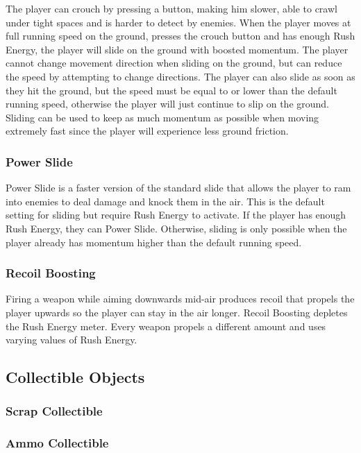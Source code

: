 \documentclass[12pt]{article}
\begin{document}
The player can crouch by pressing a button, making him slower, able to crawl under tight spaces and is harder to detect by enemies. When the player moves at full running speed on the ground, presses the crouch button and has enough Rush Energy, the player will slide on the ground with boosted momentum. The player cannot change movement direction when sliding on the ground, but can reduce the speed by attempting to change directions. The player can also slide as soon as they hit the ground, but the speed must be equal to or lower than the default running speed, otherwise the player will just continue to slip on the ground. Sliding can be used to keep as much momentum as possible when moving extremely fast since the player will experience less ground friction. 

\subsubsection{Power Slide}

Power Slide is a faster version of the standard slide that allows the player to ram into enemies to deal damage and knock them in the air. This is the default setting for sliding but require Rush Energy to activate. If the player has enough Rush Energy, they can Power Slide. Otherwise, sliding is only possible when the player already has momentum higher than the default running speed. 

\subsubsection{Recoil Boosting}

Firing a weapon while aiming downwards mid-air produces recoil that propels the player upwards so the player can stay in the air longer. Recoil Boosting depletes the Rush Energy meter. Every weapon propels a different amount and uses varying values of Rush Energy. 

\subsection{Collectible Objects}

\subsubsection{Scrap Collectible}

\subsubsection{Ammo Collectible}
\end{document}
